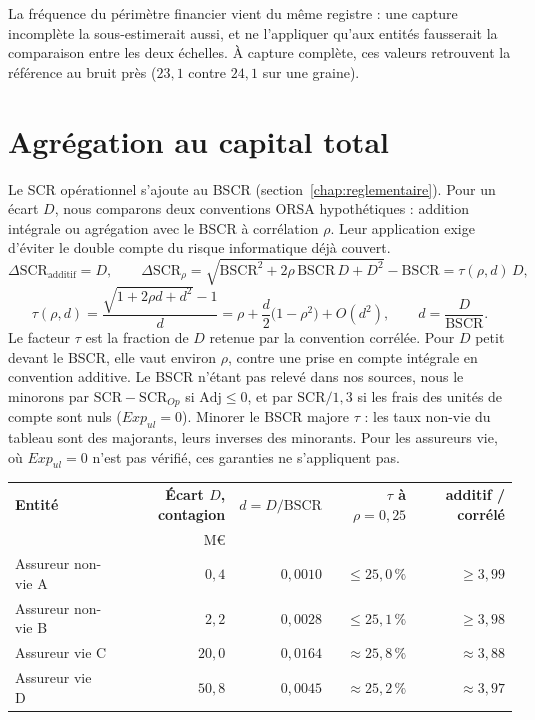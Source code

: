 La fréquence du périmètre financier vient du même registre : une capture incomplète la sous-estimerait
aussi, et ne l'appliquer qu'aux entités fausserait la comparaison entre les deux échelles. À capture
complète, ces valeurs retrouvent la référence au bruit près ($23{,}1$ contre $24{,}1$ sur une graine).

\section{Agrégation au capital total}
\label{sec:agregation-scr}

Le SCR opérationnel s'ajoute au BSCR (section~\ref{chap:reglementaire}). Pour un écart $D$, nous comparons
deux conventions ORSA hypothétiques : addition intégrale ou agrégation avec le BSCR à corrélation
$\rho$. Leur application exige d'éviter le double compte du risque informatique déjà couvert.
\begin{equation}\label{eq:agregation}
\Delta\mathrm{SCR}_{\text{additif}} = D,\qquad
\Delta\mathrm{SCR}_{\rho}=\sqrt{\mathrm{BSCR}^2+2\rho\,\mathrm{BSCR}\,D+D^2}-\mathrm{BSCR}
=\tau(\rho,d)\,D,
\end{equation}
\begin{equation}\label{eq:tau}
\tau(\rho,d)=\frac{\sqrt{1+2\rho d+d^2}-1}{d}
=\rho+\frac{d}{2}\bigl(1-\rho^2\bigr)+O(d^2),\qquad d=\frac{D}{\mathrm{BSCR}} .
\end{equation}
Le facteur $\tau$ est la fraction de $D$ retenue par la convention corrélée. Pour $D$ petit devant le
BSCR, elle vaut environ $\rho$, contre une prise en compte intégrale en convention additive.
Le BSCR n'étant pas relevé dans nos sources, nous le minorons par $\mathrm{SCR}-\mathrm{SCR}_{Op}$ si $\mathrm{Adj}\le0$,
et par $\mathrm{SCR}/1{,}3$ si les frais des unités de compte sont nuls ($Exp_{ul}=0$).
Minorer le BSCR majore $\tau$ : les taux non-vie du tableau sont des majorants, leurs inverses des
minorants. Pour les assureurs vie, où $Exp_{ul}=0$ n'est pas vérifié, ces garanties ne s'appliquent pas.

\begin{center}\small
\renewcommand{\arraystretch}{1.25}
\begin{tabular}{@{}l r r r r@{}}
\toprule
\textbf{Entité} & \textbf{Écart $D$, contagion} & \textbf{$d = D/\mathrm{BSCR}$} &
\textbf{$\tau$ à $\rho = 0{,}25$} & \textbf{additif / corrélé} \\
 & M\euro & & & \\
\midrule
Assureur non-vie A & $0{,}4$ & $0{,}0010$ & $\leq 25{,}0\,\%$ & $\geq 3{,}99$ \\
Assureur non-vie B & $2{,}2$ & $0{,}0028$ & $\leq 25{,}1\,\%$ & $\geq 3{,}98$ \\
Assureur vie C & $20{,}0$ & $0{,}0164$ & $\approx 25{,}8\,\%$ & $\approx 3{,}88$ \\
Assureur vie D & $50{,}8$ & $0{,}0045$ & $\approx 25{,}2\,\%$ & $\approx 3{,}97$ \\
\bottomrule
\end{tabular}
\end{center}

